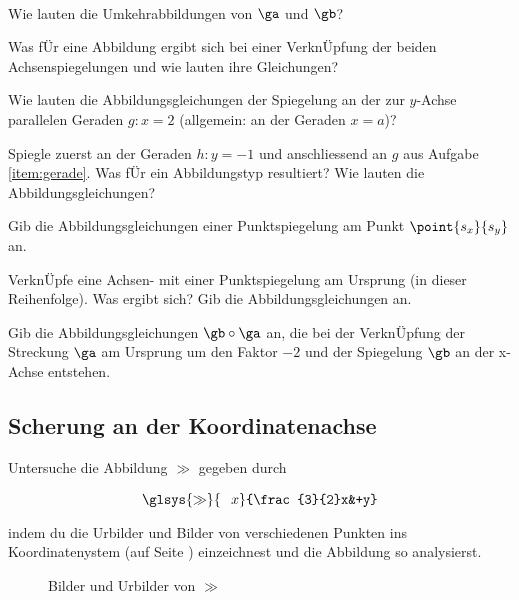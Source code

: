 \documentclass[%
11pt,%
twoside,%
titlepage,%
german,%
headsepline%
]{scrartcl}
\begin{document}
\begin{ueb}
\ \\[-4ex]
\begin{enumeratea}
\item Wie lauten die Umkehrabbildungen von $\ga$ und $\gb$?
\item Was f\"Ur eine Abbildung ergibt sich bei einer Verkn\"Upfung der beiden Achsenspiegelungen und wie lauten ihre Gleichungen?
\item\label{item:gerade} Wie lauten die Abbildungsgleichungen der Spiegelung an der zur $y$-Achse parallelen Geraden $g: x = 2$ (allgemein: an der Geraden $x = a$)?
\item Spiegle zuerst an der Geraden $h: y = -1$ und anschliessend an $g$ aus Aufgabe \eqref{item:gerade}. Was f\"Ur ein Abbildungstyp resultiert? Wie lauten die Abbildungsgleichungen?
\item Gib die Abbildungsgleichungen einer Punktspiegelung am Punkt $\point{s_x}{s_y}$ an.
\item Verkn\"Upfe eine Achsen- mit einer Punktspiegelung am Ursprung (in dieser Reihenfolge). Was ergibt sich? Gib die Abbildungsgleichungen an.
\item Gib die Abbildungsgleichungen $\gb\circ\ga$ an, die bei der Verkn\"Upfung der Streckung $\ga$ am Ursprung um den Faktor $-2$ und der Spiegelung $\gb$ an der x-Achse entstehen.
\end{enumeratea}
\end{ueb}

\subsection{Scherung an der Koordinatenachse}
Untersuche die Abbildung $\gg$ gegeben durch
$$\glsys{\gg}{\phantom{\frac{3}{2}}x}{\frac{3}{2}x&+y}$$
indem du die Urbilder und Bilder von verschiedenen Punkten ins Koordinatenystem (auf Seite \pageref{bilderundurbilder}) einzeichnest und die Abbildung so analysierst.

\begin{figure}
\begin{center}
\end{center}
\caption{Bilder und Urbilder von $\gg$}\label{bilderundurbilder}
\end{figure}
\end{document}
